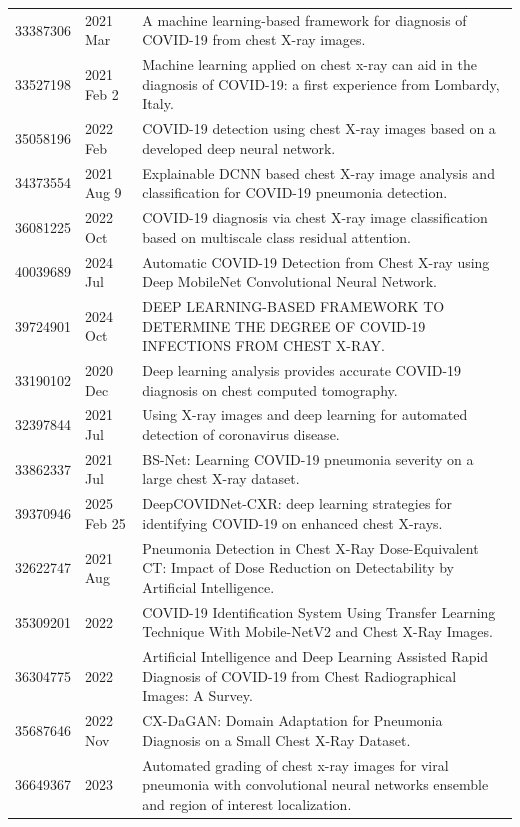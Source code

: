 \begin{longtable}{llp{9.5cm}}
33387306 & 2021 Mar & A machine learning-based framework for diagnosis of COVID-19 from chest X-ray images. \\
33527198 & 2021 Feb 2 & Machine learning applied on chest x-ray can aid in the diagnosis of COVID-19: a first experience from Lombardy, Italy. \\
35058196 & 2022 Feb & COVID-19 detection using chest X-ray images based on a developed deep neural network. \\
34373554 & 2021 Aug 9 & Explainable DCNN based chest X-ray image analysis and classification for COVID-19 pneumonia detection. \\
36081225 & 2022 Oct & COVID-19 diagnosis via chest X-ray image classification based on multiscale class residual attention. \\
40039689 & 2024 Jul & Automatic COVID-19 Detection from Chest X-ray using Deep MobileNet Convolutional Neural Network. \\
39724901 & 2024 Oct & DEEP LEARNING-BASED FRAMEWORK TO DETERMINE THE DEGREE OF COVID-19 INFECTIONS FROM CHEST X-RAY. \\
33190102 & 2020 Dec & Deep learning analysis provides accurate COVID-19 diagnosis on chest computed tomography. \\
32397844 & 2021 Jul & Using X-ray images and deep learning for automated detection of coronavirus disease. \\
33862337 & 2021 Jul & BS-Net: Learning COVID-19 pneumonia severity on a large chest X-ray dataset. \\
39370946 & 2025 Feb 25 & DeepCOVIDNet-CXR: deep learning strategies for identifying COVID-19 on enhanced chest X-rays. \\
32622747 & 2021 Aug & Pneumonia Detection in Chest X-Ray Dose-Equivalent CT: Impact of Dose Reduction on Detectability by Artificial Intelligence. \\
35309201 & 2022 & COVID-19 Identification System Using Transfer Learning Technique With Mobile-NetV2 and Chest X-Ray Images. \\
36304775 & 2022 & Artificial Intelligence and Deep Learning Assisted Rapid Diagnosis of COVID-19 from Chest Radiographical Images: A Survey. \\
35687646 & 2022 Nov & CX-DaGAN: Domain Adaptation for Pneumonia Diagnosis on a Small Chest X-Ray Dataset. \\
36649367 & 2023 & Automated grading of chest x-ray images for viral pneumonia with convolutional neural networks ensemble and region of interest localization. \\

\end{longtable}

